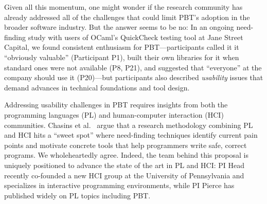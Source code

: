 \newcommand{\participant}[1]{{P#1}}

Given all this momentum, one might wonder if the research community has
already
addressed all of the challenges that could limit PBT's adoption
in the broader software industry.  But the answer seems to be no:
In an ongoing need-finding study with users of OCaml's QuickCheck testing tool
at Jane Street Capital, we found
consistent enthusiasm for PBT---participants called it it
``obviously valuable'' (Participant \participant{1}),
built their own libraries for it when standard ones were not available
(\participant{8},
\participant{21}), and suggested that ``everyone'' at the company should use it
(\participant{20})---but participants also described {\em usability} issues
that demand advances in technical foundations and
tool design.

Addressing usability challenges in PBT requires insights from both the
programming languages (PL) and
human-computer interaction (HCI) communities.  Chasins et
al.~\cite{chasins_pl_2021} argue that a research methodology
combining PL and HCI hits a ``sweet spot'' where need-finding techniques identify
current pain points and motivate concrete tools that help programmers write
safe, correct programs. We wholeheartedly agree.
Indeed, the team behind this proposal is uniquely positioned to advance the
state of the art in PL and HCI: PI Head recently co-founded
a new HCI group at the University of Pennsylvania and specializes in interactive
programming environments, while PI Pierce has
published widely on PL topics including PBT.

